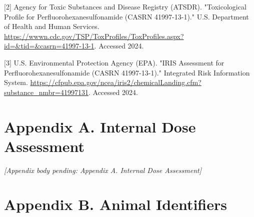 [2] Agency for Toxic Substances and Disease Registry (ATSDR). "Toxicological Profile for Perfluorohexanesulfonamide (CASRN 41997-13-1)." U.S. Department of Health and Human Services. \url{https://wwwn.cdc.gov/TSP/ToxProfiles/ToxProfiles.aspx?id=&tid=&casrn=41997-13-1}. Accessed 2024.

[3] U.S. Environmental Protection Agency (EPA). "IRIS Assessment for Perfluorohexanesulfonamide (CASRN 41997-13-1)." Integrated Risk Information System. \url{https://cfpub.epa.gov/ncea/iris2/chemicalLanding.cfm?substance_nmbr=41997131}. Accessed 2024.

\section{Appendix A. Internal Dose Assessment}

\emph{[Appendix body pending: Appendix A. Internal Dose Assessment]}

\section{Appendix B. Animal Identifiers}

